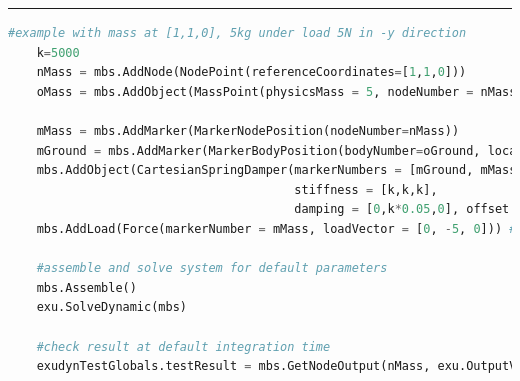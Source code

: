 \vspace{6pt}\par\noindent\rule{\textwidth}{0.4pt}
\label{miniExample_ObjectConnectorCartesianSpringDamper}
\pythonstyle
\begin{lstlisting}[language=Python, firstnumber=1]
    #example with mass at [1,1,0], 5kg under load 5N in -y direction
    k=5000
    nMass = mbs.AddNode(NodePoint(referenceCoordinates=[1,1,0]))
    oMass = mbs.AddObject(MassPoint(physicsMass = 5, nodeNumber = nMass))
    
    mMass = mbs.AddMarker(MarkerNodePosition(nodeNumber=nMass))
    mGround = mbs.AddMarker(MarkerBodyPosition(bodyNumber=oGround, localPosition = [1,1,0]))
    mbs.AddObject(CartesianSpringDamper(markerNumbers = [mGround, mMass], 
                                        stiffness = [k,k,k], 
                                        damping = [0,k*0.05,0], offset = [0,0,0]))
    mbs.AddLoad(Force(markerNumber = mMass, loadVector = [0, -5, 0])) #static solution=-5/5000=-0.001m

    #assemble and solve system for default parameters
    mbs.Assemble()
    exu.SolveDynamic(mbs)

    #check result at default integration time
    exudynTestGlobals.testResult = mbs.GetNodeOutput(nMass, exu.OutputVariableType.Displacement)[1]
\end{lstlisting}

